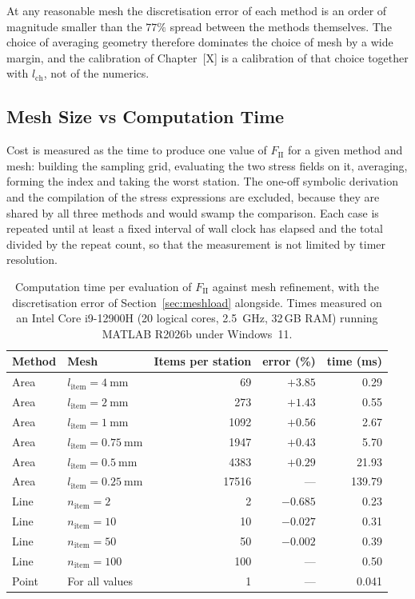 At any reasonable mesh the discretisation error of each method is an order of
magnitude smaller than the $77\%$ spread between the methods themselves. The
choice of averaging geometry therefore dominates the choice of mesh by a wide
margin, and the calibration of Chapter~[X] is a calibration of that choice
together with $l_{\mathrm{ch}}$, not of the numerics.
 
\subsection{Mesh Size vs Computation Time}
\label{sec:meshtime}
 
Cost is measured as the time to produce one value of
$F_{\mathrm{II}}$ for a given method and mesh: building the sampling grid,
evaluating the two stress fields on it, averaging, forming the index and
taking the worst station. The one-off symbolic derivation and the compilation
of the stress expressions are excluded, because they are shared by all three
methods and would swamp the comparison. Each case is repeated until at least
a fixed interval of wall clock has elapsed and the total divided by the
repeat count, so that the measurement is not limited by timer resolution.
 
\begin{table}[htbp]
\centering
\caption{Computation time per evaluation of $F_{\mathrm{II}}$ against mesh
         refinement, with the discretisation error of
         Section~\ref{sec:meshload} alongside.
         Times measured on an Intel
         Core i9-12900H (20 logical cores, \SI{2.5}{\giga\hertz}, 32\,GB
         RAM) running MATLAB R2026b under Windows~11.}
\label{tab:senstime}
\begin{tabular}{llrrr}
\toprule
Method & Mesh & Items per station
       & error (\si{\percent}) & time (\si{\milli\second}) \\
\midrule
Area  & $l_{\mathrm{item}} = \SI{4}{\milli\metre}$    &    69 & $+3.85$ &   0.29 \\
Area  & $l_{\mathrm{item}} = \SI{2}{\milli\metre}$    &   273 & $+1.43$ &   0.55 \\
Area  & $l_{\mathrm{item}} = \SI{1}{\milli\metre}$    &  1092 & $+0.56$ &   2.67 \\
Area  & $l_{\mathrm{item}} = \SI{0.75}{\milli\metre}$ &  1947 & $+0.43$ &   5.70 \\
Area  & $l_{\mathrm{item}} = \SI{0.5}{\milli\metre}$  &  4383 & $+0.29$ &  21.93 \\
Area  & $l_{\mathrm{item}} = \SI{0.25}{\milli\metre}$ & 17516 & ---     & 139.79 \\
\midrule
Line  & $n_{\mathrm{item}} = 2$   &   2 & $-0.685$ & 0.23 \\
Line  & $n_{\mathrm{item}} = 10$  &  10 & $-0.027$ & 0.31 \\
Line  & $n_{\mathrm{item}} = 50$  &  50 & $-0.002$ & 0.39 \\
Line  & $n_{\mathrm{item}} = 100$ & 100 & ---      & 0.50 \\
\midrule
Point & For all values & 1 & --- & 0.041 \\
\bottomrule
\end{tabular}
\end{table}
 
